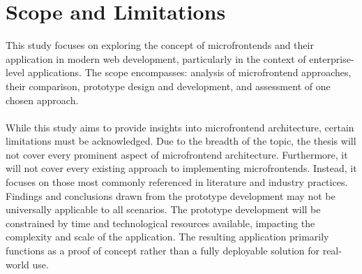 \section{Scope and Limitations}
This study focuses on exploring the concept of microfrontends and their application in modern web development, particularly in the context of enterprise-level applications. The scope encompasses: analysis of microfrontend approaches, their comparison, prototype design and development, and assessment of one chosen approach. \\\\
While this study aims to provide insights into microfrontend architecture, certain limitations must be acknowledged. Due to the breadth of the topic, the thesis will not cover every prominent aspect of microfrontend architecture. Furthermore, it will not cover every existing approach to implementing microfrontends. Instead, it focuses on those most commonly referenced in literature and industry practices. Findings and conclusions drawn from the prototype development may not be universally applicable to all scenarios. The prototype development will be constrained by time and technological resources available, impacting the complexity and scale of the application. The resulting application primarily functions as a proof of concept rather than a fully deployable solution for real-world use.